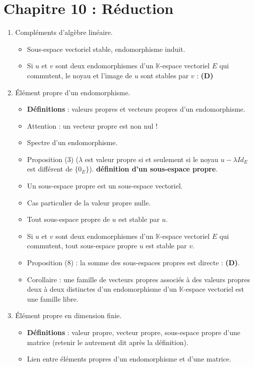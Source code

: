 \documentclass[twoside,a4paper,french,10pt]{VcCours}
\begin{document}
  \section*{Chapitre 10 : Réduction}
\begin{enumerate}
\item Compléments d'algèbre linéaire.
\begin{itemize}
\item Sous-espace vectoriel stable, endomorphisme induit.
\item Si $u$ et $v$ sont deux endomorphismes d'un $\mathbb{K}$-espace vectoriel $E$ qui commutent, le noyau et l'image de $u$ sont stables par $v$ : \textbf{(D)}
\end{itemize}
\item Élément propre d'un endomorphisme.
\begin{itemize}
\item \textbf{Définitions} : valeurs propres et vecteurs propres d'un endomorphisme.
\item Attention : un vecteur propre est non nul ! 
\item Spectre d'un endomorphisme.
\item Proposition (3) ($\lambda$ est valeur propre si et seulement si le noyau $u- \lambda Id_E$ est différent de $\lbrace 0_E \rbrace$). \textbf{définition d'un sous-espace propre}.
\item Un sous-espace propre est un sous-espace vectoriel.
\item Cas particulier de la valeur propre nulle.
\item Tout sous-espace propre de $u$ est stable par $u$. 
\item Si $u$ et $v$ sont deux endomorphismes d'un $\mathbb{K}$-espace vectoriel $E$ qui commutent, tout sous-espace propre $u$ est stable par $v$.
\item Proposition (8) : la somme des sous-espaces propres est directe : \textbf{(D)}.
\item Corollaire : une famille de vecteurs propres associés à des valeurs propres deux à deux distinctes d'un endomorphisme d'un $\mathbb{K}$-espace vectoriel est une famille libre.
\end{itemize}
\item Élément propre en dimension finie.
\begin{itemize}
\item \textbf{Définitions} : valeur propre, vecteur propre, sous-espace propre d'une matrice (retenir le \og autrement dit \fg après la définition).
\item Lien entre éléments propres d'un endomorphisme et d'une matrice.

\end{itemize}
\end{enumerate}
\end{document}
